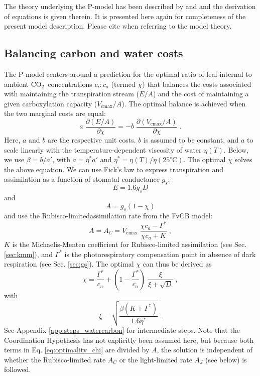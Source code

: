 \documentclass{myreport}
\newcommand{\coo}{CO$_2$}
\begin{document}
The theory underlying the P-model has been described by \cite{prentice14ecollett} and \cite{wang17natpl} and the derivation of equations is given therein. It is presented here again for completeness of the present model description. Please cite \cite{wang17natpl} when referring to the model theory. 

\subsection{Balancing carbon and water costs}
\label{sec:watercarbon}
The P-model centers around a prediction for the optimal ratio of leaf-internal to ambient \coo\ concentrations $c_i:c_a$ (termed $\chi$) that balances the costs associated with maintaining the transpiration stream ($E/A$) and the cost of maintaining a given carboxylation capacity ($V_{\mathrm{cmax}}/A$). The optimal balance is achieved when the two marginal costs are equal: 
\begin{equation}
\label{eq:optimality_chi}
a \; \frac{\partial (E/A)}{\partial \chi} = -b \; \frac{\partial (V_{\mathrm{cmax}}/A)}{\partial \chi}\;.
\end{equation}
Here, $a$ and $b$ are the respective unit costs. $b$ is assumed to be constant, and $a$ to scale linearly with the temperature-dependent viscosity of water $\eta(T)$. Below, we use $\beta = b / a'$, with $a = \eta^\ast a'$ and $\eta^\ast = \eta(T) / \eta(25^{\circ}\text{C})$. The optimal $\chi$ solves the above equation. We can use Fick's law \citep{fick1855} to express transpiration and assimilation as a function of stomatal conductance $g_s$: 
\begin{equation}
\label{eq:egs}
    E = 1.6 g_s D
\end{equation}
and 
\begin{equation}
\label{eq:ags}
    A = g_s (1-\chi)   
\end{equation}
and use the Rubisco-limitedassimilation rate from the FvCB model:
\begin{equation}
\label{eq:ac}
A = A_C = V_{\mathrm{cmax}} \; \frac{\chi c_a-\Gamma^{\ast}}{\chi c_a + K}\; ,
\end{equation}
$K$ is the Michaelis-Menten coefficient for Rubisco-limited assimilation (see Sec. \ref{sec:kmm}), and $\Gamma^{\ast}$ is the photorespiratory compensation point in absence of dark respiration (see Sec. \ref{sec:gs}). The optimal $\chi$ can thus be derived as
\begin{equation}
\label{eq:chiopt}
\chi = \frac{\Gamma^{\ast}}{c_a} + \left(1- \frac{\Gamma^{\ast}}{c_a}\right)\;\frac{\xi}{\xi + \sqrt{D}}\;,
\end{equation}
with 
\begin{equation}
\label{eq:xi}
\xi = \sqrt{\frac{\beta (K+\Gamma^{\ast})}{1.6 \eta^{\ast}}}\;.
\end{equation}
See Appendix \ref{app:steps_watercarbon} for intermediate steps. Note that the Coordination Hypothesis has not explicitly been assumed here, but because both terms in Eq. \ref{eq:optimality_chi} are divided by $A$, the solution is independent of whether the Rubisco-limited rate $A_C$ or the light-limited rate $A_J$ (see below) is followed.
\end{document}
